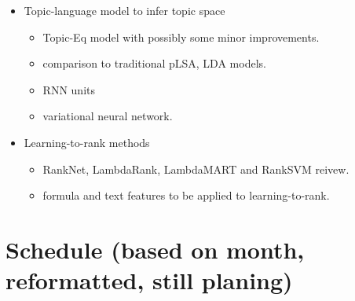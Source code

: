\documentclass[11pt]{artikel3}
\begin{document}
\begin{itemize}
\begin{itemize}
    \end{itemize}

\item Topic-language model to infer topic space

    \begin{itemize}

    \item Topic-Eq model with possibly some minor improvements.

    \item comparison to traditional pLSA, LDA models.

    \item RNN units

    \item variational neural network.

    \end{itemize}

\item Learning-to-rank methods

    \begin{itemize}

    \item RankNet, LambdaRank, LambdaMART and RankSVM reivew.

    \item formula and text features to be applied to learning-to-rank.

    \end{itemize}

\end{itemize}





\section{Schedule (based on month, reformatted, still planing)}
\end{document}
